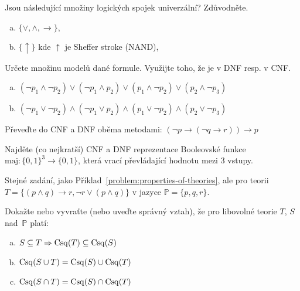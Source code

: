 \begin{problem} 
    
    Jsou následující množiny logických spojek univerzální? Zdůvodněte.
    \begin{enumerate}[(a)]
        \item $\{\vee, \wedge, \rightarrow\}$,
        \item $\{\uparrow\}$ kde $\uparrow$ je Sheffer stroke (NAND),
    \end{enumerate}

\end{problem}


\begin{problem} 
        
    Určete množinu modelů dané formule. Využijte toho, že je v DNF resp. v CNF.
    \begin{enumerate}[(a)]
        \item $(\neg p_1 \wedge \neg p_2)\vee( \neg p_1 \wedge p_2)\vee( p_1 \wedge \neg p_2)\vee( p_2 \wedge \neg p_3)$
        \item $(\neg p_1 \vee \neg p_2)\wedge( \neg p_1 \vee p_2)\wedge( p_1 \vee \neg p_2)\wedge( p_2 \vee \neg p_3)$
    \end{enumerate}

\end{problem}


\begin{problem} 
    
    Převeďte do CNF a DNF oběma metodami: $(\neg p \to (\neg q \to r))\to p$
    
\end{problem}


\begin{problem} 
    
    Najděte (co nejkratší) CNF a DNF reprezentace Booleovské funkce $\mathrm{maj}\colon\{0,1\}^3\to \{0,1\}$, která vrací převládající hodnotu mezi 3 vstupy.

\end{problem}


\begin{problem}
    
    Stejné zadání, jako Příklad~\ref{problem:properties-of-theories}, ale pro teorii $T=\{(p\wedge q)\to r, \neg r\vee(p\wedge q)\}$ v jazyce $\mathbb P=\{p,q,r\}$.
    
\end{problem}


\begin{problem}
    
    Dokažte nebo vyvraťte (nebo uveďte správný vztah), že pro libovolné teorie $T$, $S$ nad~$\mathbb{P}$ platí:
    \begin{enumerate}[(a)]
        \item $S\subseteq T \Rightarrow \operatorname{Csq}(T) \subseteq \operatorname{Csq}(S)$
        \item $\operatorname{Csq}(S\cup T)=\operatorname{Csq}(S) \cup \operatorname{Csq}(T)$
        \item $\operatorname{Csq}(S\cap T)=\operatorname{Csq}(S) \cap \operatorname{Csq}(T)$
    \end{enumerate}

\end{problem}


